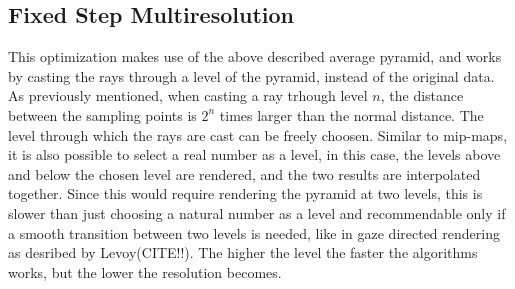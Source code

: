 {\subsection{Fixed Step Multiresolution}
This optimization makes use of the above described average pyramid, and works by casting the rays through a level of the pyramid, instead of the original data. As previously mentioned, when casting a ray trhough level $n$, the distance between the sampling points is $2^n$ times larger than the normal distance. The level through which the rays are cast can be freely choosen. Similar to mip-maps, it is also possible to select a real number as a level, in this case, the levels above and below the chosen level are rendered, and the two results are interpolated together. Since this would require rendering the pyramid at two levels, this is slower than just choosing a natural number as a level and recommendable only if a smooth transition between two levels is needed, like in gaze directed rendering as desribed by Levoy(CITE!!). The higher the level the faster the algorithms works, but the lower the resolution becomes.

}
